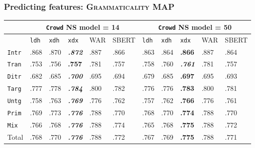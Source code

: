 \documentclass[handout,xcolor={dvipsnames}]{beamer}
\newcommand{\feat}[1]{\textsc{#1}}
\newcommand{\param}[1]{\texttt{#1}}
\begin{document}


\begin{frame}
\frametitle{Predicting features: \feat{Grammaticality} MAP}

\small

\begin{table}[htb!]
\begin{center}
\setlength{\tabcolsep}{.35em}
\begin{tabular}{|l||l|l|l||l|l||l|l|l||l|l|}
\hline
 & \multicolumn{5}{c||}{\param{Crowd} NS model = 14} & \multicolumn{5}{c|}{\param{Crowd} NS model = 50} \\
\hline
    		& \param{ldh}	& \param{xdh} &	\param{xdx} & WAR	& {\scriptsize SBERT} & \param{ldh}	& \param{xdh} &	\param{xdx} & WAR	& {\scriptsize SBERT} \\ \hline
\hline
\param{Intr}  & .868 & .870 & \textit{\textbf{.872}} & .887 & .866 & .863 & .864 & \textbf{.866} & .887 & .864 \\ \hline
\param{Tran}  & .753 & .756 & \textbf{.757} & .781 & .757 & .758 & .760 & \textit{\textbf{.761}} & .781 & .757 \\ \hline
\param{Ditr}  & .682 & .685 & \textit{\textbf{.700}} & .695 & .694 & .679 & .685 & \textbf{.697} & .695 & .693 \\ \hline
\hline
\param{Targ}  & .777 & .778 & \textit{\textbf{.784}} & .800 & .782 & .776 & .776 & \textbf{.783} & .800 & .781 \\ \hline
\param{Untg}  & .758 & .763 & \textit{\textbf{.769}} & .776 & .762 & .757 & .762 & \textbf{.766} & .776 & .761 \\ \hline
\hline
\param{Prim}  & .769 & .773 & \textit{\textbf{.776}} & .788 & .770 & .768 & .770 & \textbf{.774} & .788 & .770 \\ \hline
\param{Mix}   & .766 & .768 & \textit{\textbf{.776}} & .788 & .774 & .765 & .768 & \textbf{.775} & .788 & .772 \\ \hline
\hline
Total & .768 & .770 & \textit{\textbf{.776}} & .788 & .772 & .767 & .769 & \textbf{.775} & .788 & .771 \\ \hline
\end{tabular}
\end{center}
\end{table}


\end{frame}
\end{document}
